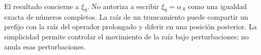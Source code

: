 El resultado concierne a \(\xi_9\). No autoriza a escribir
\(\xi_9=\alpha_A\) como una igualdad exacta de números completos.
La raíz de un truncamiento puede compartir un prefijo con la raíz del
operador prolongado y diferir en una posición posterior. La simplicidad
permite controlar el movimiento de la raíz bajo perturbaciones; no
anula esas perturbaciones.


